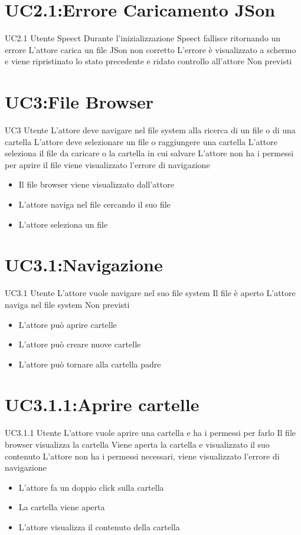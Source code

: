 \documentclass[../AnalisideiRequisiti.tex]{subfiles}
\begin{document}
	\section{UC2.1:Errore Caricamento JSon}
	\UserCase
	{UC2.1}
	{Utente}
	{Speect}
	{Durante l'inizializzazione Speect fallisce ritornando un errore }
	{L'attore carica un file JSon non corretto}
	{L'errore è visualizzato a schermo e viene ripristinato lo stato precedente e ridato controllo all'attore}
	{Non previsti}
	{}

	
	\section{UC3:File Browser}
	\UserCase
	{UC3}
	{Utente}
	{}
	{L'attore deve navigare nel file system alla ricerca di un file o di una cartella}
	{L'attore deve selezionare un file o raggiungere una cartella}
	{L'attore seleziona il file da caricare o la cartella in cui salvare}
	{L'attore non ha i permessi per aprire il file viene visualizzato l'errore di navigazione }
	{
		\begin{itemize}
			\item{} Il file browser viene visualizzato dall'attore
			\item{} L'attore naviga nel file  cercando il suo file 
			\item{} L'attore seleziona un file 
		\end{itemize}
	}
	\section{UC3.1:Navigazione}
	\UserCase
	{UC3.1}
	{Utente}
	{}
	{L'attore vuole navigare nel suo file system}
	{Il file  è aperto}
	{L'attore naviga nel file system}
	{Non previsti}
	{
		\begin{itemize}
			\item{} L'attore può aprire cartelle 
			\item{} L'attore può creare nuove cartelle 
			\item{} L'attore può tornare alla cartella padre 
		\end{itemize}
	}	
	\section{UC3.1.1:Aprire cartelle}
	\UserCase
	{UC3.1.1}
	{Utente}
	{}
	{L'attore vuole aprire una cartella e ha i permessi per farlo}
	{Il file browser visualizza la cartella}
	{Viene aperta la cartella e visualizzato il suo contenuto}
	{L'attore non ha i permessi necessari, viene visualizzato l'errore di navigazione }
	{
		\begin{itemize}
			\item{} L'attore fa un doppio click sulla cartella
			\item{} La cartella viene aperta
			\item{} L'attore visualizza il contenuto della cartella
		\end{itemize}
	}
\end{document}
